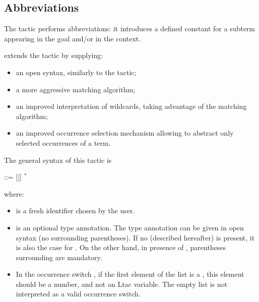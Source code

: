 \subsection{Abbreviations}\label{ssec:set}


The \ssr{}  tactic performs abbreviations: it introduces a
defined constant for a subterm appearing in the goal and/or in the
context.

\ssr{} extends the  tactic by supplying:
\begin{itemize}
\item an open syntax, similarly to the  tactic;
\item a more aggressive matching algorithm;
\item an improved interpretation of wildcards, taking advantage of the
  matching algorithm;
\item an improved occurrence selection mechanism allowing to abstract only
  selected occurrences of a term.
\end{itemize}

The general syntax of this tactic is
\begin{center}
   \ssrC{:=}  
\end{center}
\begin{center}
 ::= \ssrC{\{}[\ssrC{+}|\ssrC{-}] {\naturalnumber}$^*$ \ssrC{\}}
\end{center}


where:

\begin{itemize}
\item {} is a fresh identifier chosen by the user.
\item {} is
an optional type annotation. The type annotation  can be
given in open syntax (no surrounding parentheses). If no 
(described hereafter) is present, it is also
the case for .
On the other hand, in  presence of , parentheses
surrounding  are mandatory.
\item In the occurrence switch , if the first element
  of the list is a {\naturalnumber}, this element should be a number, and not
  an Ltac variable. The empty list \ssrC{\{\}} is not interpreted as a
  valid occurrence switch.
\end{itemize}

